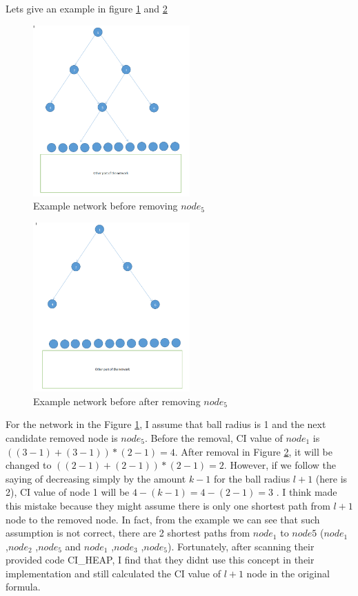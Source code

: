 \documentclass{article}
\begin{document}
	

	Let\textquotesingle s give an example in figure \ref{fig:figure1} and \ref{fig:figure2}

	\begin{figure}[htp]
		\centering 
		\includegraphics[width = 6cm]{1.png}
		\caption{Example network before removing $node_5$  }
		\label{fig:figure1}
	\end{figure}

	\begin{figure}[htp]
	\centering 
	\includegraphics[width = 6cm]{2.png}
	\caption{Example network before after removing $node_5$  }
	\label{fig:figure2}
	\end{figure}
	
	
	For the network in the Figure \ref{fig:figure1}, I assume that ball radius is 1 and the next candidate removed node is $node_5$. Before the removal, CI value of $node_1$ is $((3-1)+(3-1))*(2-1)=4$. After removal in Figure \ref{fig:figure2}, it will be changed to $((2-1)+(2-1))*(2-1)=2$. However, if we follow the saying of decreasing simply by the amount $k − 1$ for the ball radius $l + 1$ (here is 2), CI value of node 1 will be $4-(k-1)=4-(2-1)=3$ . I think \cite{morone2016collective} made this mistake because they might assume there is only one shortest path from $l + 1$ node to the removed node. In fact, from the example we can see that such assumption is not correct, there are 2 shortest paths from $node_1$ to $node 5$ ($node_1$ ,$node_2$ ,$node_5$ and $node_1$ ,$node_3$ ,$node_5$). Fortunately, after scanning their provided code CI\_HEAP, I find that they didn\textquotesingle t use this concept in their implementation and still calculated the CI value of $l + 1$ node in the original formula.
	
\end{document}
